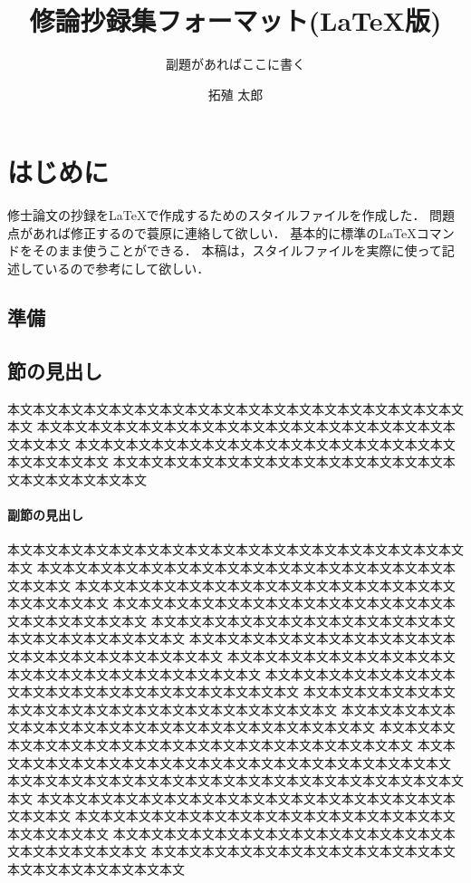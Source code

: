 \documentclass{mta}
\title{修論抄録集フォーマット(\LaTeX{}版)}
\subtitle{副題があればここに書く} %
\author{拓殖 太郎}
\begin{document}
\maketitle

\chapter{はじめに}

修士論文の抄録を\LaTeX{}で作成するためのスタイルファイルを作成した．
問題点があれば修正するので蓑原に連絡して欲しい．
基本的に標準の\LaTeX{}コマンドをそのまま使うことができる．
本稿は，スタイルファイルを実際に使って記述しているので参考にして欲しい．

\section{準備}



\section{節の見出し}
本文本文本文本文本文本文本文本文本文本文本文本文本文本文本文本文本文本文本文
本文本文本文本文本文本文本文本文本文本文本文本文本文本文本文本文本文本文本文
本文本文本文本文本文本文本文本文本文本文本文本文本文本文本文本文本文本文本文
本文本文本文本文本文本文本文本文本文本文本文本文本文本文本文本文本文本文本文

\subsubsection{副節の見出し}
本文本文本文本文本文本文本文本文本文本文本文本文本文本文本文本文本文本文本文
本文本文本文本文本文本文本文本文本文本文本文本文本文本文本文本文本文本文本文
本文本文本文本文本文本文本文本文本文本文本文本文本文本文本文本文本文本文本文
本文本文本文本文本文本文本文本文本文本文本文本文本文本文本文本文本文本文本文
本文本文本文本文本文本文本文本文本文本文本文本文本文本文本文本文本文本文本文
本文本文本文本文本文本文本文本文本文本文本文本文本文本文本文本文本文本文本文
本文本文本文本文本文本文本文本文本文本文本文本文本文本文本文本文本文本文本文
本文本文本文本文本文本文本文本文本文本文本文本文本文本文本文本文本文本文本文
本文本文本文本文本文本文本文本文本文本文本文本文本文本文本文本文本文本文本文
本文本文本文本文本文本文本文本文本文本文本文本文本文本文本文本文本文本文本文
本文本文本文本文本文本文本文本文本文本文本文本文本文本文本文本文本文本文本文
本文本文本文本文本文本文本文本文本文本文本文本文本文本文本文本文本文本文本文
本文本文本文本文本文本文本文本文本文本文本文本文本文本文本文本文本文本文本文
本文本文本文本文本文本文本文本文本文本文本文本文本文本文本文本文本文本文本文
本文本文本文本文本文本文本文本文本文本文本文本文本文本文本文本文本文本文本文
本文本文本文本文本文本文本文本文本文本文本文本文本文本文本文本文本文本文本文
本文本文本文本文本文本文本文本文本文本文本文本文本文本文本文本文本文本文本文
\end{document}
